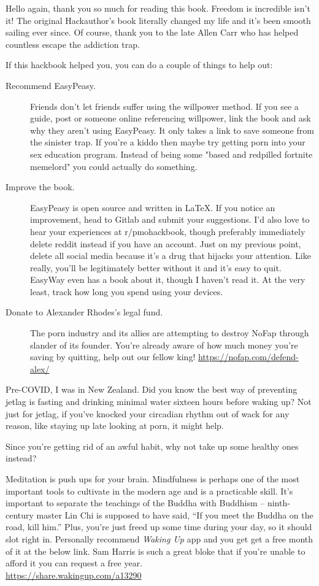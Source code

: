 \documentclass[easypeasy.tex]{subfiles}
\begin{document}
Hello again, thank you so much for reading this book. Freedom is incredible isn't it! The original Hackauthor's book literally changed my life and it's been smooth sailing ever since. Of course, thank you to the late Allen Carr who has helped countless escape the addiction trap.

If this hackbook helped you, you can do a couple of things to help out:
  \begin{description}
    \item [Recommend EasyPeasy.] Friends don't let friends suffer using the willpower method. If you see a guide, post or someone online referencing willpower, link the book and ask why they aren't using EasyPeasy. It only takes a link to save someone from the sinister trap. If you're a kiddo then maybe try getting porn into your sex education program. Instead of being some "based and redpilled fortnite memelord" you could actually do something.

  \item [Improve the book.] EasyPeasy is open source and written in LaTeX. If you notice an improvement, head to Gitlab and submit your suggestions. I'd also love to hear your experiences at r/pmohackbook, though preferably immediately delete reddit instead if you have an account. Just on my previous point, delete all social media because it's a drug that hijacks your attention. Like really, you'll be legitimately better without it and it's easy to quit. EasyWay even has a book about it, though I haven't read it. At the very least, track how long you spend using your devices.

  \item [Donate to Alexander Rhodes's legal fund.] The porn industry and its allies are attempting to destroy NoFap through slander of its founder. You're already aware of how much money you're saving by quitting, help out our fellow king! \url{https://nofap.com/defend-alex/}
  \end{description}

Pre-COVID, I was in New Zealand. Did you know the best way of preventing jetlag is fasting and drinking minimal water sixteen hours before waking up? Not just for jetlag, if you've knocked your circadian rhythm out of wack for any reason, like staying up late looking at porn, it might help.

Since you're getting rid of an awful habit, why not take up some healthy ones instead?

Meditation is push ups for your brain. Mindfulness is perhaps one of the most important tools to cultivate in the modern age and is a practicable skill. It's important to separate the teachings of the Buddha with Buddhism -- ninth-century master Lin Chi is supposed to have said, “If you meet the Buddha on the road, kill him.” Plus, you're just freed up some time during your day, so it should slot right in. Personally recommend \textit{Waking Up} app and you get get a free month of it at the below link. Sam Harris is such a great bloke that if you're unable to afford it you can request a free year. \\ \url{https://share.wakingup.com/a13290}
\end{document}

